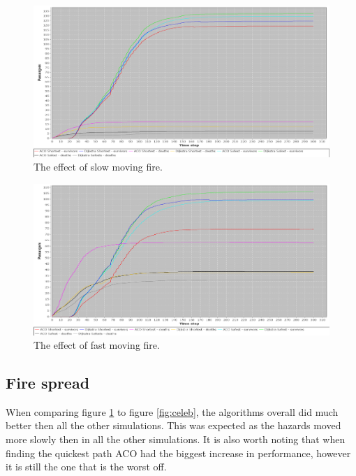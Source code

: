 \begin{figure} [h]
\centering
\hspace*{-1.0in}
\includegraphics[scale=0.35]{images/Graph-using-200-rounds-140-passangers-slow-fire.png}
\caption{The effect of slow moving fire.}
\label{fig:celebSfire}
\end{figure}

\begin{figure} [h]
\centering
\hspace*{-1.0in}
\includegraphics[scale=0.35]{images/Graph-using-200-rounds-140-passangers-and-fast-fire.png}
\caption{The effect of fast moving fire.}
\label{fig:celebFfire}
\end{figure}

\subsection{Fire spread}

When comparing figure \ref{fig:celebSfire} to figure \ref{fig:celeb}, the algorithms overall did much better then all the other simulations. This was expected as the hazards moved more slowly then in all the other simulations. It is also worth noting that when finding the quickest path ACO had the biggest increase in performance, however it is still the one that is the worst off.

